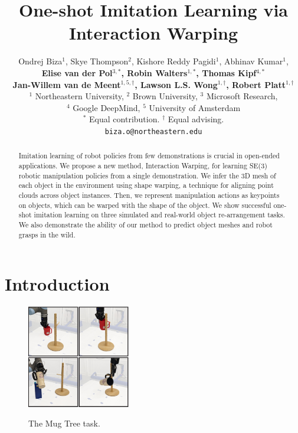 \documentclass{article}
\title{One-shot Imitation Learning via Interaction Warping}
\author{
  Ondrej Biza$^1$, Skye Thompson$^2$, Kishore Reddy Pagidi$^1$, Abhinav Kumar$^1$, \\
  \textbf{Elise van der Pol$^{3,*}$, Robin Walters$^{1,*}$, Thomas Kipf$^{4,*}$} \\
  \textbf{Jan-Willem van de Meent$^{1,5,\dag}$, Lawson L.S. Wong$^{1,\dag}$, Robert Platt$^{1,\dag}$} \\
  $^1$ Northeastern University, $^2$ Brown University, $^3$ Microsoft Research, \\$^4$ Google DeepMind, $^5$ University of Amsterdam \\
  $^*$ Equal contribution. $^\dag$ Equal advising. \\
  \texttt{biza.o@northeastern.edu} \\
}
\begin{document}
\maketitle


\begin{abstract}
Imitation learning of robot policies from few demonstrations is crucial in open-ended applications. We propose a new method, Interaction Warping, for learning SE(3) robotic manipulation policies from a single demonstration. We infer the 3D mesh of each object in the environment using shape warping, a technique for aligning point clouds across object instances. Then, we represent manipulation actions as keypoints on objects, which can be warped with the shape of the object. We show successful one-shot imitation learning on three simulated and real-world object re-arrangement tasks. We also demonstrate the ability of our method to predict object meshes and robot grasps in the wild.
\end{abstract}



\section{Introduction}

\begin{figure}
\vspace{-0.5cm}
  \begin{center}
    \includegraphics[width=0.4\textwidth]{figures/intro_2.pdf} \\
    \end{center}
\vspace{-0.2cm}
\caption{The Mug Tree task.}
\label{fig:mugontree}
\end{figure}
\end{document}
